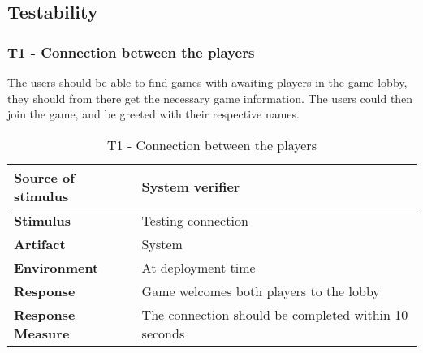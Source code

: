 \subsection{Testability}

\subsubsection{T1 - Connection between the players}
The users should be able to find games with awaiting players in the game lobby, they should from there get the necessary game information. The users could then join the game, and be greeted with their respective names. 

\begin{table}[h!]
\begin{tabular}{ | p{110pt} | p{250pt}  |}
\hline
\bf Source of stimulus & System verifier  \\ \hline
\bf Stimulus & Testing connection \\ \hline 
\bf Artifact & System  \\  \hline
\bf Environment & At deployment time \\ \hline
\bf Response & Game welcomes both players to the lobby \\ \hline
\bf Response Measure & The connection should be completed within 10 seconds \\ \hline

\end{tabular}
\caption{T1 - Connection between the players}
\end{table}

\pagebreak



